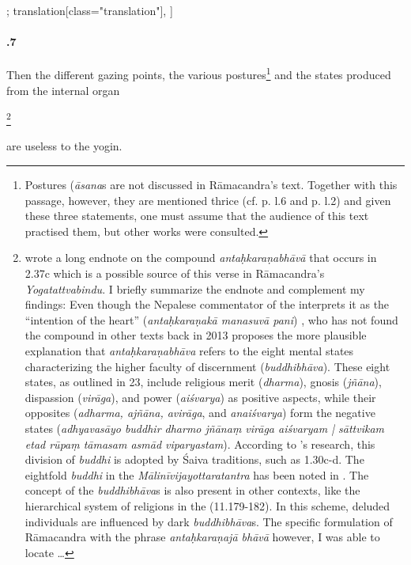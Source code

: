 \begin{alignment}[
  texts=edition[class="edition"];
  translation[class="translation"],
  ]
\begin{translation}
\begin{tlate}[58_7]
      \paragraph{.7} Then the different gazing points, the various postures\footnote{Postures (\textit{āsana}s are not discussed in Rāmacandra's text. Together with this passage, however, they are mentioned thrice (cf. p.\pageref{ashtanga} l.6 and p.\pageref{majesty} l.2) and given these three statements, one must assume that the audience of this text practised them, but other works were consulted.} and the states produced from the internal organ\begin{buber}[f58_1]\footnote{\citeauthor[2013:368, fn. 52]{birch2013} wrote a long endnote on the compound \textit{antaḥkaraṇabhāvā} that occurs in  2.37c which is a possible source of this verse in Rāmacandra's \textit{Yogatattvabindu}. I briefly summarize the endnote and complement my findings: Even though the Nepalese commentator of the  interprets it as the ``intention of the heart'' (\textit{antaḥkaraṇakā manasuvā pani}) \citeauthor{birch2013}, who has not found the compound in other texts back in 2013 proposes the more plausible explanation that \textit{antaḥkaraṇabhāva} refers to the eight mental states characterizing the higher faculty of discernment (\textit{buddhibhāva}). These eight states, as outlined in  23, include religious merit (\textit{dharma}), gnosis (\textit{jñāna}), dispassion (\textit{virāga}), and power (\textit{aiśvarya}) as positive aspects, while their opposites (\textit{adharma, ajñāna, avirāga}, and \textit{anaiśvarya}) form the negative states (\textit{adhyavasāyo buddhir dharmo jñānaṃ virāga aiśvaryam | sāttvikam etad rūpaṃ tāmasam asmād viparyastam}). According to \citeauthor{birch2013}'s research, this division of \textit{buddhi} is adopted by Śaiva traditions, such as  1.30c-d. The eightfold \textit{buddhi} in the \textit{Mālinīvijayottaratantra} has been noted in \citeauthor[2004:353, fn. 8]{vasudeva2004}. The concept of the \textit{buddhibhāva}s is also present in other contexts, like the hierarchical system of religions in the  (11.179-182). In this scheme, deluded individuals are influenced by dark \textit{buddhibhāva}s. The specific formulation of Rāmacandra with the phrase \textit{antaḥkaraṇajā bhāvā} however, I was able to locate \ldots}\end{buber} are useless to the yogin.
    \end{tlate}
    \begin{tlate}[58_8]

\end{tlate}
\end{translation}
\end{alignment}

